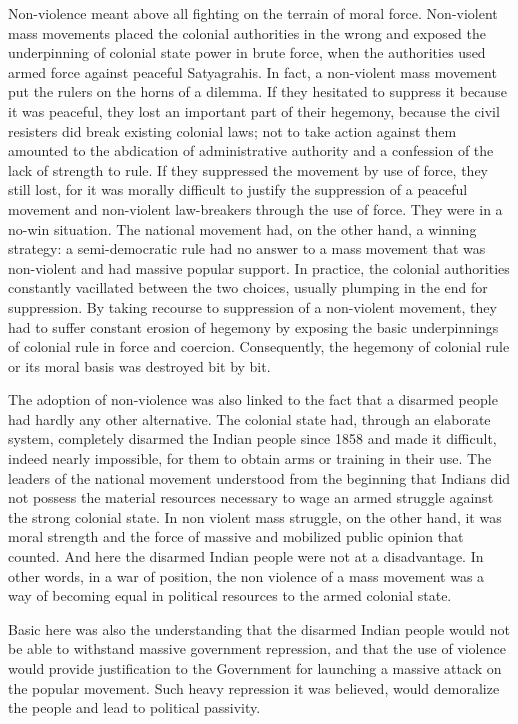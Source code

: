 Non-violence meant above all fighting on the terrain of moral force. Non-violent mass movements placed the colonial authorities in the wrong and exposed the underpinning of colonial state power in brute force, when the authorities used armed force against peaceful Satyagrahis. In fact, a non-violent mass movement put the rulers on the horns of a dilemma. If they hesitated to suppress it because it was peaceful, they lost an important part of their hegemony, because the civil resisters did break existing colonial laws; not to take action against them amounted to the abdication of administrative authority and a confession of the lack of strength to rule. If they suppressed the movement by use of force, they still lost, for it was morally difficult to justify the suppression of a peaceful movement and non-violent law-breakers through the use of force. They were in a no-win situation. The national movement had, on the other hand, a winning strategy: a semi-democratic rule had no answer to a mass movement that was non-violent and had massive popular support. In practice, the colonial authorities constantly vacillated between the two choices, usually plumping in the end for suppression. By taking recourse to suppression of a non-violent movement, they had to suffer constant erosion of hegemony by exposing the basic underpinnings of colonial rule in force and coercion. Consequently, the hegemony of colonial rule or its moral basis was destroyed bit by bit. 

The adoption of non-violence was also linked to the fact that a disarmed people had hardly any other alternative. The colonial state had, through an elaborate system, completely disarmed the Indian people since 1858 and made it difficult, indeed nearly impossible, for them to obtain arms or training in their use. The leaders of the national movement understood from the beginning that Indians did not possess the material resources necessary to wage an armed struggle against the strong colonial state. In non­ violent mass struggle, on the other hand, it was moral strength and the force of massive and mobilized public opinion that counted. And here the disarmed Indian people were not at a disadvantage. In other words, in a war of position, the non­ violence of a mass movement was a way of becoming equal in political resources to the armed colonial state. 

Basic here was also the understanding that the disarmed Indian people would not be able to withstand massive government repression, and that the use of violence would provide justification to the Government for launching a massive attack on the popular movement. Such heavy repression it was believed, would demoralize the people and lead to political passivity. 

